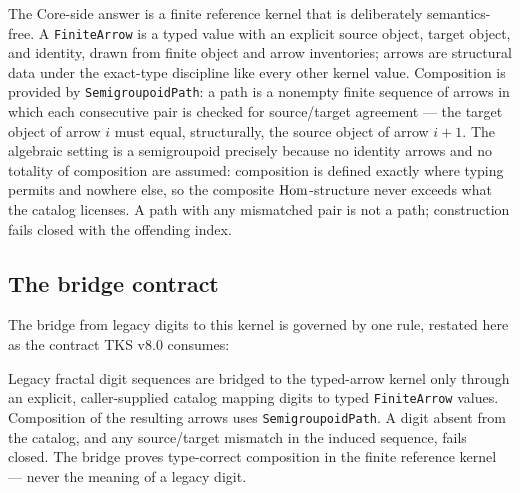 The Core-side answer is a finite reference kernel that is deliberately semantics-free. A \texttt{FiniteArrow} is a typed value with an explicit source object, target object, and identity, drawn from finite object and arrow inventories; arrows are structural data under the exact-type discipline like every other kernel value. Composition is provided by \texttt{SemigroupoidPath}: a path is a nonempty finite sequence of arrows in which each consecutive pair is checked for source/target agreement --- the target object of arrow $i$ must equal, structurally, the source object of arrow $i+1$. The algebraic setting is a semigroupoid precisely because no identity arrows and no totality of composition are assumed: composition is defined exactly where typing permits and nowhere else, so the composite $\mathrm{Hom}$-structure never exceeds what the catalog licenses. A path with any mismatched pair is not a path; construction fails closed with the offending index.

\subsection{The bridge contract}\label{integ:tks:bridge}

The bridge from legacy digits to this kernel is governed by one rule, restated here as the contract TKS v8.0 consumes:

\begin{ruleenv}\label{integ:rule:bridge}
Legacy fractal digit sequences are bridged to the typed-arrow kernel only through an explicit, caller-supplied catalog mapping digits to typed \texttt{FiniteArrow} values. Composition of the resulting arrows uses \texttt{SemigroupoidPath}. A digit absent from the catalog, and any source/target mismatch in the induced sequence, fails closed. The bridge proves type-correct composition in the finite reference kernel --- never the meaning of a legacy digit.
\end{ruleenv}

